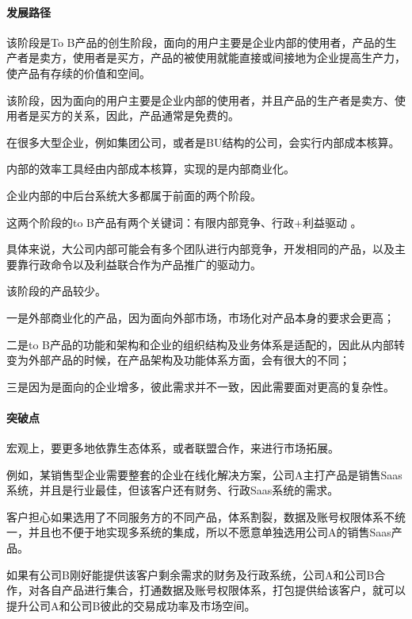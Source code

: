 \documentclass[letterpaper,11pt,english]{sphinxmanual}
\begin{document}
\paragraph{发展路径}
\label{\detokenize{chapter_introduction/2B:id12}}

该阶段是To
B产品的创生阶段，面向的用户主要是企业内部的使用者，产品的生产者是卖方，使用者是买方，产品的被使用就能直接或间接地为企业提高生产力，使产品有存续的价值和空间。

该阶段，因为面向的用户主要是企业内部的使用者，并且产品的生产者是卖方、使用者是买方的关系，因此，产品通常是免费的。


在很多大型企业，例如集团公司，或者是BU结构的公司，会实行内部成本核算。

内部的效率工具经由内部成本核算，实现的是内部商业化。

企业内部的中后台系统大多都属于前面的两个阶段。

这两个阶段的to B产品有两个关键词：有限内部竞争、行政+利益驱动 。

具体来说，大公司内部可能会有多个团队进行内部竞争，开发相同的产品，以及主要靠行政命令以及利益联合作为产品推广的驱动力。


该阶段的产品较少。

一是外部商业化的产品，因为面向外部市场，市场化对产品本身的要求会更高；

二是to
B产品的功能和架构和企业的组织结构及业务体系是适配的，因此从内部转变为外部产品的时候，在产品架构及功能体系方面，会有很大的不同；

三是因为是面向的企业增多，彼此需求并不一致，因此需要面对更高的复杂性。


\paragraph{突破点}
\label{\detokenize{chapter_introduction/2B:id13}}
宏观上，要更多地依靠生态体系，或者联盟合作，来进行市场拓展。

例如，某销售型企业需要整套的企业在线化解决方案，公司A主打产品是销售Saas系统，并且是行业最佳，但该客户还有财务、行政Saas系统的需求。

客户担心如果选用了不同服务方的不同产品，体系割裂，数据及账号权限体系不统一，并且也不便于地实现多系统的集成，所以不愿意单独选用公司A的销售Saas产品。

如果有公司B刚好能提供该客户剩余需求的财务及行政系统，公司A和公司B合作，对各自产品进行集合，打通数据及账号权限体系，打包提供给该客户，就可以提升公司A和公司B彼此的交易成功率及市场空间。
\end{document}
